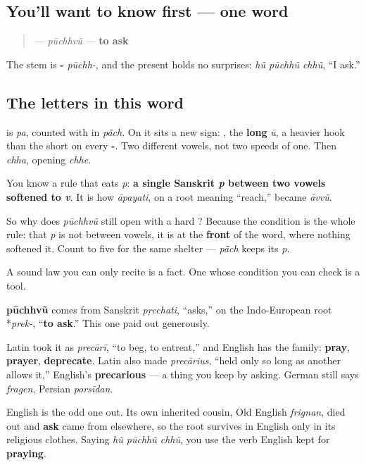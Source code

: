 \subsection*{You'll want to know first — one word}
\begin{quote}
\textbf{} — \emph{pūchhvũ} — \textbf{to ask}
\end{quote}

The stem is \textbf{-} \emph{pūchh-}, and the present holds no surprises: \emph{hũ pūchhũ chhũ}, \textquotedblleft{}I ask.\textquotedblright{}

\subsection*{The letters in this word}
\textbf{} is \emph{pa}, counted with in \textbf{} \emph{pā̃ch}. On it sits a new sign: \textbf{}, the \textbf{long} \emph{ū}, a heavier hook than the short \textbf{} on every \textbf{-}. Two different vowels, not two speeds of one. Then \textbf{} \emph{chha}, opening \textbf{} \emph{chhe}.

\begin{grammarlens}[title={What you've built: a p that stayed because of where it stood}]
You know a rule that eats \emph{p}: \textbf{a single Sanskrit \emph{p} between two vowels softened to \emph{v}}. It is how \emph{āpayati}, on a root meaning \textquotedblleft{}reach,\textquotedblright{} became \textbf{} \emph{āvvũ}.

So why does \emph{pūchhvũ} still open with a hard \textbf{}? Because the condition is the whole rule: that \emph{p} is not between vowels, it is at the \textbf{front} of the word, where nothing softened it. Count to five for the same shelter — \textbf{} \emph{pā̃ch} keeps its \emph{p}.

A sound law you can only recite is a fact. One whose condition you can check is a tool.
\end{grammarlens}

\begin{cousinweb}
\textbf{pūchhvũ} comes from Sanskrit \emph{pṛcchati}, \textquotedblleft{}asks,\textquotedblright{} on the Indo-European root *\emph{prek-}, \textquotedblleft{}\textbf{to ask}.\textquotedblright{} This one paid out generously.

Latin took it as \emph{precārī}, \textquotedblleft{}to beg, to entreat,\textquotedblright{} and English has the family: \textbf{pray}, \textbf{prayer}, \textbf{deprecate}. Latin also made \emph{precārius}, \textquotedblleft{}held only so long as another allows it,\textquotedblright{} English's \textbf{precarious} — a thing you keep by asking. German still says \emph{fragen}, Persian \emph{porsīdan}.

English is the odd one out. Its own inherited cousin, Old English \emph{frignan}, died out and \textbf{ask} came from elsewhere, so the root survives in English only in its religious clothes. Saying \emph{hũ pūchhũ chhũ}, you use the verb English kept for \textbf{praying}.
\end{cousinweb}

